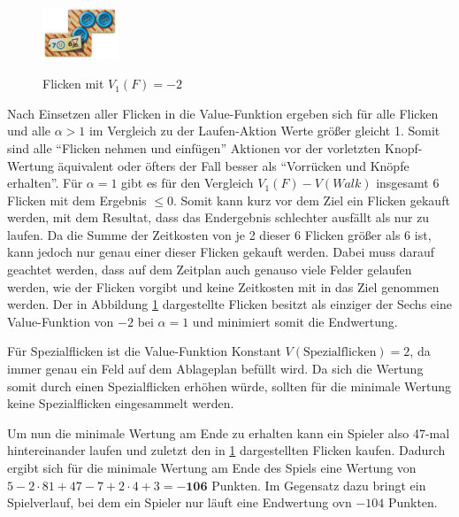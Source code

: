 \begin{figure}
    \vspace*{-0.5cm}
    \centering
    \includegraphics[width=0.2\textwidth]{res/pictures/assets/04-front.png}
    \vspace{-10pt}
    \caption[Flicken mit $V_1\left(F\right) = -2$]{\unskip}
    Flicken mit $V_1\left(F\right) = -2$
    \label{fig:negative-value-patch}
    \vspace*{-0.375cm}
\end{figure}

Nach Einsetzen aller Flicken in die Value-Funktion ergeben sich für alle Flicken und alle $\alpha > 1$ im Vergleich zu der Laufen-Aktion Werte größer gleicht 1. Somit sind alle \enquote{Flicken nehmen und einfügen} Aktionen vor der vorletzten Knopf-Wertung äquivalent oder öfters der Fall besser als \enquote{Vorrücken und Knöpfe erhalten}. Für $\alpha = 1$ gibt es für den Vergleich $ V_1\left(F\right) - V\left(Walk\right)$ insgesamt 6 Flicken mit dem Ergebnis $\le 0$. Somit kann kurz vor dem Ziel ein Flicken gekauft werden, mit dem Resultat, dass das Endergebnis schlechter ausfällt als nur zu laufen. Da die Summe der Zeitkosten von je 2 dieser 6 Flicken größer als 6 ist, kann jedoch nur genau einer dieser Flicken gekauft werden. Dabei muss darauf geachtet werden, dass auf dem Zeitplan auch genauso viele Felder gelaufen werden, wie der Flicken vorgibt und keine Zeitkosten mit in das Ziel genommen werden. Der in Abbildung \ref{fig:negative-value-patch} dargestellte Flicken besitzt als einziger der Sechs eine Value-Funktion von $-2$ bei $\alpha = 1$ und minimiert somit die Endwertung.

Für Spezialflicken ist die Value-Funktion Konstant $V\left(\text{Spezialflicken}\right) = 2$, da immer genau ein Feld auf dem Ablageplan befüllt wird. Da sich die Wertung somit durch einen Spezialflicken erhöhen würde, sollten für die minimale Wertung keine Spezialflicken eingesammelt werden.

Um nun die minimale Wertung am Ende zu erhalten kann ein Spieler also 47-mal hintereinander laufen und zuletzt den in \ref{fig:negative-value-patch} dargestellten Flicken kaufen. Dadurch ergibt sich für die minimale Wertung am Ende des Spiels eine Wertung von $5 - 2 \cdot 81 + 47 - 7 + 2 \cdot 4 + 3 = \boldsymbol{-106}$ Punkten. Im Gegensatz dazu bringt ein Spielverlauf, bei dem ein Spieler nur läuft eine Endwertung ovn $-104$ Punkten.

